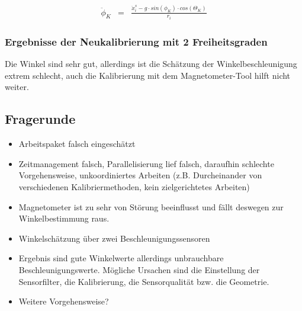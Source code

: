 \documentclass{article}
\begin{document}
\begin{equation}
\begin{array}{lcl}
\ddot{\phi}_K
& = &
\frac{\ddot{x}^s_i - g \cdot sin(\phi_K) \cdot cos(\Theta_K)}{r_i}
\end{array}
\end{equation}

\subsubsection{Ergebnisse der Neukalibrierung mit 2 Freiheitsgraden}
Die Winkel sind sehr gut, allerdings ist die Schätzung der Winkelbeschleunigung extrem schlecht, auch die Kalibrierung mit dem Magnetometer-Tool hilft nicht weiter.

\newpage
\subsection{Fragerunde}
\begin{itemize}
\item Arbeitspaket falsch eingeschätzt
\item Zeitmanagement falsch, Parallelisierung lief falsch, daraufhin schlechte Vorgehensweise, unkoordiniertes Arbeiten (z.B. Durcheinander von verschiedenen Kalibriermethoden, kein zielgerichtetes Arbeiten)
\item Magnetometer ist zu sehr von Störung beeinflusst und fällt deswegen zur Winkelbestimmung raus.
\item Winkelschätzung über zwei Beschleunigungssensoren
\item Ergebnis sind gute Winkelwerte allerdings unbrauchbare Beschleunigungswerte. Mögliche Ursachen sind die Einstellung der Sensorfilter, die Kalibrierung, die Sensorqualität bzw. die Geometrie.

\item Weitere Vorgehensweise? 
\end{itemize}
\end{document}
